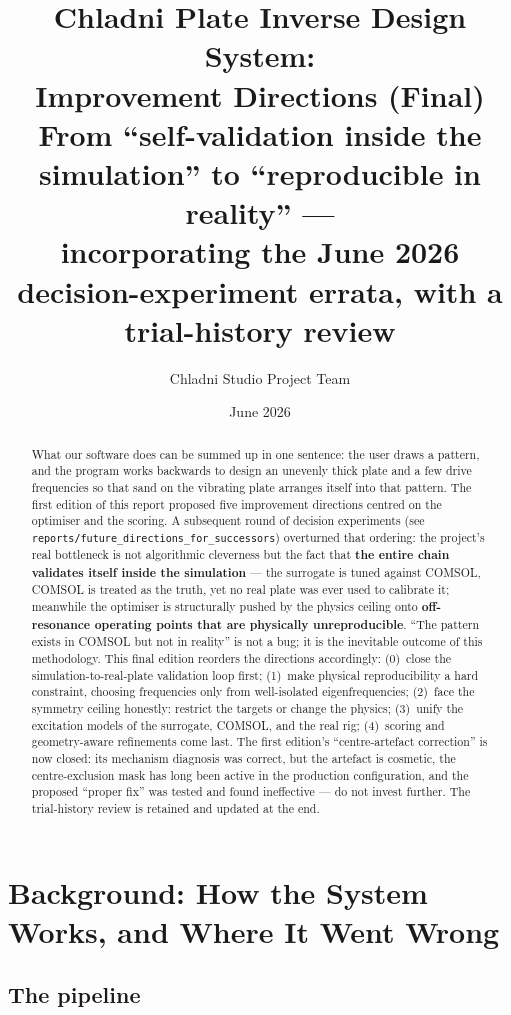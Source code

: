 \documentclass[11pt,a4paper]{article}
\title{\textbf{Chladni Plate Inverse Design System:\\Improvement Directions (Final)\\
\large From ``self-validation inside the simulation'' to ``reproducible in reality'' ---\\
\large incorporating the June 2026 decision-experiment errata, with a trial-history review}}
\author{Chladni Studio Project Team}
\date{June 2026}
\newcommand{\code}[1]{\texttt{#1}}
\begin{document}
\maketitle

\begin{abstract}
What our software does can be summed up in one sentence: the user draws a pattern, and the program works backwards to design an unevenly thick plate and a few drive frequencies so that sand on the vibrating plate arranges itself into that pattern. The first edition of this report proposed five improvement directions centred on the optimiser and the scoring. A subsequent round of decision experiments (see \code{reports/future\_directions\_for\_successors}) overturned that ordering: the project's real bottleneck is not algorithmic cleverness but the fact that \textbf{the entire chain validates itself inside the simulation} --- the surrogate is tuned against COMSOL, COMSOL is treated as the truth, yet no real plate was ever used to calibrate it; meanwhile the optimiser is structurally pushed by the physics ceiling onto \textbf{off-resonance operating points that are physically unreproducible}. ``The pattern exists in COMSOL but not in reality'' is not a bug; it is the inevitable outcome of this methodology. This final edition reorders the directions accordingly: (0)~close the simulation-to-real-plate validation loop first; (1)~make physical reproducibility a hard constraint, choosing frequencies only from well-isolated eigenfrequencies; (2)~face the symmetry ceiling honestly: restrict the targets or change the physics; (3)~unify the excitation models of the surrogate, COMSOL, and the real rig; (4)~scoring and geometry-aware refinements come last. The first edition's ``centre-artefact correction'' is now closed: its mechanism diagnosis was correct, but the artefact is cosmetic, the centre-exclusion mask has long been active in the production configuration, and the proposed ``proper fix'' was tested and found ineffective --- do not invest further. The trial-history review is retained and updated at the end.
\end{abstract}

\section{Background: How the System Works, and Where It Went Wrong}

\subsection{The pipeline}
\end{document}
